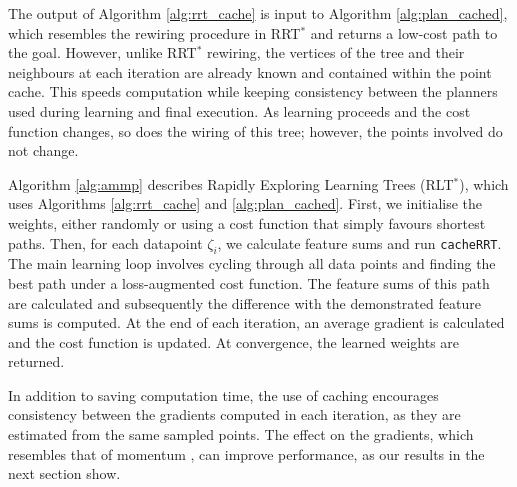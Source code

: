 \documentclass[letterpaper, 10 pt, conference]{ieeeconf}
\begin{document}
The output of Algorithm \ref{alg:rrt_cache} is input to Algorithm \ref{alg:plan_cached}, which resembles the rewiring procedure in RRT$^*$ \cite{karaman2011sampling} and returns a low-cost path to the goal. However, unlike RRT$^*$ rewiring, the vertices of the tree and their neighbours at each iteration are already known and contained within the point cache. This speeds computation while keeping consistency between the planners used during learning and final execution. As learning proceeds and the cost function changes, so does the wiring of this tree; however, the points involved do not change. %

Algorithm \ref{alg:ammp} describes Rapidly Exploring Learning Trees (RLT$^*$), which uses Algorithms \ref{alg:rrt_cache} and \ref{alg:plan_cached}. First, we initialise the weights, either randomly or using a cost function that simply favours shortest paths. Then, for each datapoint $\zeta_i$, we calculate feature sums and run \texttt{cacheRRT}. The main learning loop involves cycling through all data points and finding the best path under a loss-augmented cost function. The feature sums of this path are calculated and subsequently the difference with the demonstrated feature sums is computed. At the end of each iteration, an average gradient is calculated and the cost function is updated. At convergence, the learned weights are returned.

In addition to saving computation time, the use of caching encourages consistency between the gradients computed in each iteration, as they are estimated from the same sampled points.  The effect on the gradients, which resembles that of momentum \cite{polyak1964some}, can improve performance, as our results in the next section show.
\end{document}
